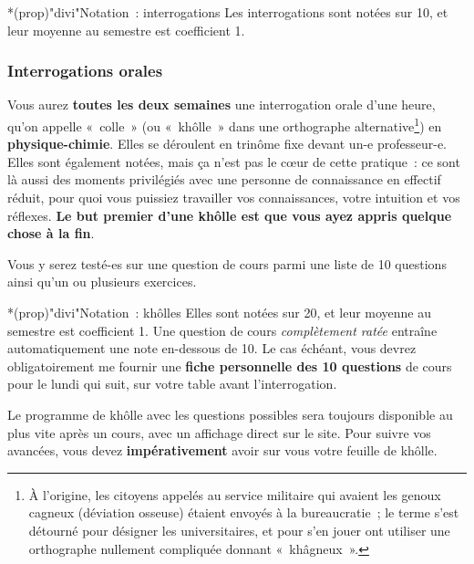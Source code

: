 \documentclass[10pt, garamond]{book}
\begin{document}
\begin{tcb}*(prop)"divi"{Notation~: interrogations}
	Les interrogations sont notées sur 10, et leur moyenne au semestre est
	coefficient 1.
\end{tcb}

\subsubsection{Interrogations orales}
Vous aurez \textbf{toutes les deux semaines} une interrogation orale d'une
heure, qu'on appelle «~colle~» (ou «~khôlle~» dans une orthographe
alternative\footnote{À l'origine, les citoyens appelés au service militaire qui
	avaient les genoux cagneux (déviation osseuse) étaient envoyés à la
	bureaucratie~; le terme s'est détourné pour désigner les universitaires, et pour
	s'en jouer ont utiliser une orthographe nullement compliquée donnant
	«~khâgneux~».}) en \textbf{physique-chimie}. Elles se déroulent en trinôme fixe
devant un-e professeur-e. Elles sont également notées, mais ça n'est pas le cœur
de cette pratique~: ce sont là aussi des moments privilégiés avec une personne
de connaissance en effectif réduit, pour quoi vous puissiez travailler vos
connaissances, votre intuition et vos réflexes. \textbf{Le but premier d'une
	khôlle est que vous ayez appris quelque chose à la fin}.

Vous y serez testé-es sur une question de cours parmi une liste de 10
questions ainsi qu'un ou plusieurs exercices.
\begin{tcb}*(prop)"divi"{Notation~: khôlles}
	Elles sont notées sur 20, et leur moyenne au semestre est coefficient 1.
	\smallbreak
	Une question de cours \textit{complètement ratée} entraîne automatiquement une
	note en-dessous de 10. Le cas échéant, vous devrez obligatoirement me fournir
	une \textbf{fiche personnelle des 10 questions} de cours pour le lundi qui
	suit, sur votre table avant l'interrogation.
\end{tcb}
Le programme de khôlle avec les questions possibles sera
toujours disponible au plus vite après un cours, avec un affichage direct sur le
site. Pour suivre vos avancées, vous devez \textbf{impérativement} avoir sur
vous votre feuille de khôlle.
\end{document}
